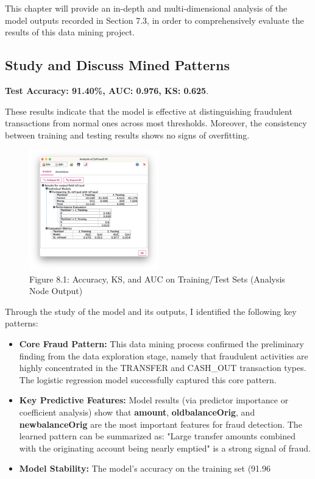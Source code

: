 \documentclass[sigplan,screen]{acmart}
\begin{document}
This chapter will provide an in-depth and multi-dimensional analysis of the model outputs recorded in Section 7.3, in order to comprehensively evaluate the results of this data mining project.

\subsection{Study and Discuss Mined Patterns}

\textbf{Test Accuracy: 91.40\%, AUC: 0.976, KS: 0.625}.

These results indicate that the model is effective at distinguishing fraudulent transactions from normal ones across most thresholds. Moreover, the consistency between training and testing results shows no signs of overfitting.

\begin{figure}[H]
    \centering
    \includegraphics[width=0.5\textwidth]{8.1.png}
    \caption*{Figure 8.1: Accuracy, KS, and AUC on Training/Test Sets (Analysis Node Output)}
    \label{fig:8.1}
\end{figure}

Through the study of the model and its outputs, I identified the following key patterns:

\begin{itemize}
    \item \textbf{Core Fraud Pattern:} This data mining process confirmed the preliminary finding from the data exploration stage, namely that fraudulent activities are highly concentrated in the TRANSFER and CASH\_OUT transaction types. The logistic regression model successfully captured this core pattern.
    
    \item \textbf{Key Predictive Features:} Model results (via predictor importance or coefficient analysis) show that \textbf{amount}, \textbf{oldbalanceOrig}, and \textbf{newbalanceOrig} are the most important features for fraud detection. The learned pattern can be summarized as: "Large transfer amounts combined with the originating account being nearly emptied" is a strong signal of fraud.
    
    \item \textbf{Model Stability:} The model's accuracy on the training set (91.96%
\end{itemize}
\end{document}

